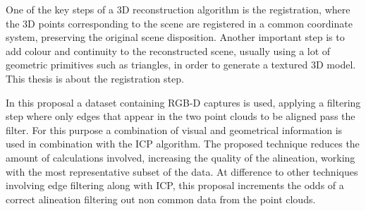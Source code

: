 One of the key steps of a 3D reconstruction algorithm is the registration, where the 3D points corresponding to
 the scene are  registered in a common coordinate system, preserving the original scene disposition. Another important 
step is to add colour and continuity to the reconstructed scene, usually using a lot of geometric primitives such as 
triangles, in order to generate a textured 3D model. This thesis is  about the registration step. 

In this proposal a dataset containing RGB-D captures is used, applying a filtering step where only edges that appear 
in the two point clouds to be aligned pass the filter. For this purpose a combination of visual and geometrical information is 
used in combination with the ICP algorithm. The proposed technique reduces the amount of calculations involved, increasing 
the quality of the alineation, working with the most representative subset of the data. At difference to other techniques 
involving edge filtering along with ICP, this proposal increments the odds of a correct alineation filtering out non common 
data from the point clouds.

 



